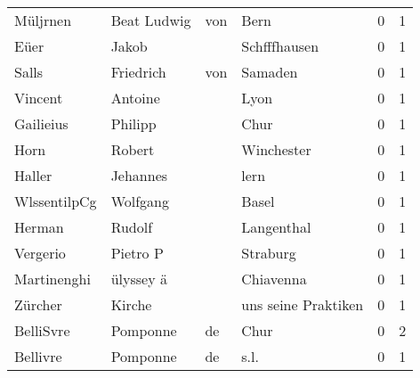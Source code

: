 \begin{tabular}{llllrr}
                 Müljrnen &                        Beat Ludwig &         von &                                        Bern &          0 &         1 \\
                     Eüer &                              Jakob &             &                                Schfffhausen &          0 &         1 \\
                    Salls &                          Friedrich &         von &                                     Samaden &          0 &         1 \\
                  Vincent &                            Antoine &             &                                        Lyon &          0 &         1 \\
                Gailieius &                            Philipp &             &                                        Chur &          0 &         1 \\
                     Horn &                             Robert &             &                                  Winchester &          0 &         1 \\
                   Haller &                           Jehannes &             &                                        lern &          0 &         1 \\
             WlssentilpCg &                           Wolfgang &             &                                       Basel &          0 &         1 \\
                   Herman &                             Rudolf &             &                                  Langenthal &          0 &         1 \\
                 Vergerio &                           Pietro P &             &                                    Straburg &          0 &         1 \\
              Martinenghi &                          ülyssey ä &             &                                   Chiavenna &          0 &         1 \\
                  Zürcher &                             Kirche &             &                         uns seine Praktiken &          0 &         1 \\
                BelliSvre &                           Pomponne &          de &                                        Chur &          0 &         2 \\
                 Bellivre &                           Pomponne &          de &                                        s.l. &          0 &         1 \\

\end{tabular}
